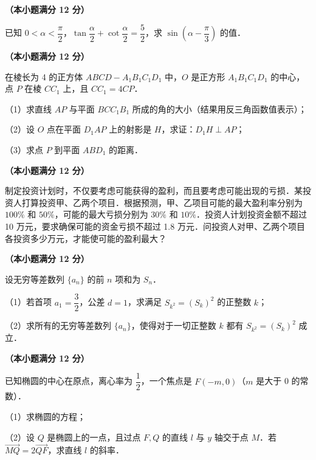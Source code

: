 \begin{question}
\textbf{（本小题满分 12 分）} 

已知 $0 < \alpha < \dfrac{\pi}{2}$，$\tan\dfrac{\alpha}{2} + \cot\dfrac{\alpha}{2} = \dfrac{5}{2}$，求 $\sin\left(\alpha - \dfrac{\pi}{3}\right)$ 的值．

\Needspace{0.4\textheight}
\end{question}
\begin{question}
\textbf{（本小题满分 12 分）} 

在棱长为 4 的正方体 $ABCD - A_1B_1C_1D_1$ 中，$O$ 是正方形 $A_1B_1C_1D_1$ 的中心，点 $P$ 在棱 $CC_1$ 上，且 $CC_1 = 4CP$．

（1）求直线 $AP$ 与平面 $BCC_1B_1$ 所成的角的大小（结果用反三角函数值表示）；

（2）设 $O$ 点在平面 $D_1AP$ 上的射影是 $H$，求证：$D_1H \perp AP$；

（3）求点 $P$ 到平面 $ABD_1$ 的距离．
\nopagebreak[4]
\begin{center}\end{center}
\nopagebreak[4]
\end{question}
\begin{question}
\textbf{（本小题满分 12 分）} 

制定投资计划时，不仅要考虑可能获得的盈利，而且要考虑可能出现的亏损．某投资人打算投资甲、乙两个项目．根据预测，甲、乙项目可能的最大盈利率分别为 $100\%$ 和 $50\%$，可能的最大亏损分别为 $30\%$ 和 $10\%$．投资人计划投资金额不超过 10 万元，要求确保可能的资金亏损不超过 1.8 万元．问投资人对甲、乙两个项目各投资多少万元，才能使可能的盈利最大？

\end{question}
\begin{question}
\textbf{（本小题满分 12 分）} 

设无穷等差数列 $\{a_n\}$ 的前 $n$ 项和为 $S_n$．

（1）若首项 $a_1 = \dfrac{3}{2}$，公差 $d = 1$，求满足 $S_{k^2} = (S_k)^2$ 的正整数 $k$；

（2）求所有的无穷等差数列 $\{a_n\}$，使得对于一切正整数 $k$ 都有 $S_{k^2} = (S_k)^2$ 成立．

\end{question}
\begin{question}
\textbf{（本小题满分 12 分）} 

已知椭圆的中心在原点，离心率为 $\dfrac{1}{2}$，一个焦点是 $F(-m, 0)$（$m$ 是大于 0 的常数）．

（1）求椭圆的方程；

（2）设 $Q$ 是椭圆上的一点，且过点 $F, Q$ 的直线 $l$ 与 $y$ 轴交于点 $M$．若 $\vec{MQ} = 2\vec{QF}$，求直线 $l$ 的斜率．

\end{question}
